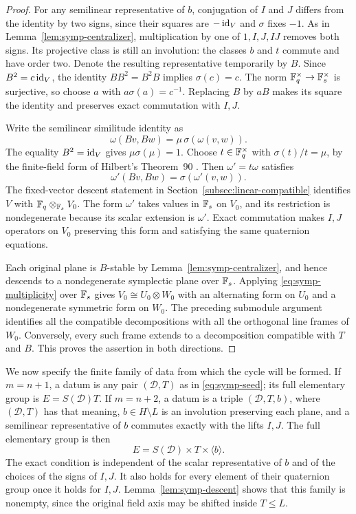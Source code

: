 \begin{proof}
For any semilinear representative of $b$, conjugation of $I$ and $J$
differs from the identity by two signs, since their squares are
$-\operatorname{id}_V$ and $\sigma$ fixes $-1$.  As in
Lemma~\ref{lem:symp-centralizer}, multiplication by one of
$1,I,J,IJ$ removes both signs.  Its projective class is still an
involution: the classes $b$ and $t$ commute and have order two.
Denote the resulting representative temporarily by $B$.  Since
$B^2=c\operatorname{id}_V$, the identity $B B^2=B^2 B$ implies $\sigma(c)=c$.
The norm $\mathbb F_q^\times\to\mathbb F_s^\times$ is surjective, so choose
$a$ with $a\sigma(a)=c^{-1}$.  Replacing $B$ by $aB$ makes its
square the identity and preserves exact commutation with $I,J$.

Write the semilinear similitude identity as
\[
\omega(Bv,Bw)=\mu\,\sigma(\omega(v,w)).
\]
The equality $B^2=\operatorname{id}_V$ gives $\mu\sigma(\mu)=1$.  Choose
$t\in\mathbb F_q^\times$ with $\sigma(t)/t=\mu$, by the finite-field
form of Hilbert's Theorem~90
\citep[Corollary~5.25]{MilneFields2022}.  Then $\omega'=t\omega$ satisfies
\[
\omega'(Bv,Bw)=\sigma(\omega'(v,w)).
\]
The fixed-vector descent statement in
Section~\ref{subsec:linear-compatible} identifies $V$ with
$\mathbb F_q\otimes_{\mathbb F_s}V_0$.  The form $\omega'$ takes values in
$\mathbb F_s$ on $V_0$, and its restriction is nondegenerate because its
scalar extension is $\omega'$.  Exact commutation makes $I,J$
operators on $V_0$ preserving this form and satisfying the same
quaternion equations.

Each original plane is $B$-stable by
Lemma~\ref{lem:symp-centralizer}, and hence descends to a
nondegenerate symplectic plane over $\mathbb F_s$.  Applying
\eqref{eq:symp-multiplicity} over $\mathbb F_s$ gives
$V_0\cong U_0\otimes W_0$ with an alternating form on $U_0$ and a
nondegenerate symmetric form on $W_0$.  The preceding submodule
argument identifies all the compatible decompositions with all the
orthogonal line frames of $W_0$.  Conversely, every such frame
extends to a decomposition compatible with $T$ and $B$.  This proves
the assertion in both directions.
\end{proof}

We now specify the finite family of data from which the cycle will be
formed.  If $m=n+1$, a datum is any pair $(\mathcal D,T)$ as in
\eqref{eq:symp-seed}; its full elementary group is $E=S(\mathcal D)T$.
If $m=n+2$, a datum is a triple $(\mathcal D,T,b)$, where
$(\mathcal D,T)$ has that meaning, $b\in H\setminus L$ is an
involution preserving each plane, and a semilinear representative of
$b$ commutes exactly with the lifts $I,J$.  The full elementary group
is then
\begin{equation}\label{eq:symp-full-data}
E=S(\mathcal D)\times T\times\langle b\rangle.
\end{equation}
The exact condition is independent of the scalar representative of
$b$ and of the choices of the signs of $I,J$.  It also holds for
every element of their quaternion group once it holds for $I,J$.
Lemma~\ref{lem:symp-descent} shows that this family is nonempty, since
the original field axis may be shifted inside $T\leq L$.

